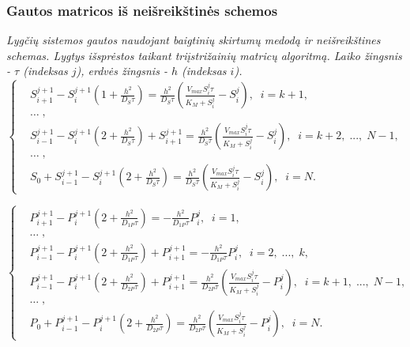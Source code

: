 \documentclass[12pt, a4paper, lithuanian]{article}
\begin{document}
\subsubsection{Gautos matricos iš neišreikštinės schemos}
\textit{Lygčių sistemos gautos naudojant baigtinių skirtumų medodą ir neišreikštines
schemas. Lygtys išsprėstos taikant triįstrižainių matricų algoritmą. Laiko
žingsnis - $\tau$ (indeksas $j$), erdvės žingsnis - $h$ (indeksas $i$).}
\begin{equation}
\left\{
\begin{aligned}
    &S_{i+1}^{j+1}-S_i^{j+1}\left(1+\frac{h^2}{D_S\tau}\right)
= \frac{h^2}{D_S\tau} \left(\frac{V_{max}S_i^j\tau}{K_M+S_i^j}-S_i^j\right),\; \;
i = k +1,\\
    &\dots\;,\\
    &S_{i-1}^{j+1}-S_i^{j+1}\left(2+\frac{h^2}{D_S\tau}\right)+S_{i+1}^{j+1}
        = \frac{h^2}{D_S\tau}
        \left(\frac{V_{max}S_i^j\tau}{K_M+S_i^j}-S_i^j\right),\; \; i =
        k +2,\;...,\;N-1,\\
    &\dots\;,\\
    &S_0 + S_{i-1}^{j+1} - S_i^{j+1}\left(2+\frac{h^2}{D_S\tau}\right)
        =  \frac{h^2}{D_S\tau}
    \left(\frac{V_{max}S_i^j\tau}{K_M+S_i^j}-S_i^j\right),\; \; i = N.
\end{aligned}
\right.
\end{equation}

\begin{equation}
\left\{
\begin{aligned}
    &P_{i+1}^{j+1}-P_i^{j+1}\left(2+\frac{h^2}{D_{1P}\tau}\right)
    = -\frac{h^2}{D_{1P}\tau} P_i^j,\; \; i = 1,\\
    &\dots\;,\\
    &P_{i-1}^{j+1}-P_i^{j+1}\left(2+\frac{h^2}{D_{1P}\tau}\right)+P_{i+1}^{j+1}
    =-\frac{h^2}{D_{1P}\tau} P_i^j,\; \; i = 2,\;...,\;k,\\
    &P_{i-1}^{j+1}-P_i^{j+1}\left(2+\frac{h^2}{D_{2P}\tau}\right)+P_{i+1}^{j+1}
    = \frac{h^2}{D_{2P}\tau}
    \left(\frac{V_{max}S_i^j\tau}{K_M+S_i^j}-P_i^j\right),\; \; i =
        k +1,\;...,\;N-1,\\
    &\dots\;,\\
    &P_0 + P_{i-1}^{j+1} - P_i^{j+1}\left(2+\frac{h^2}{D_{2P}\tau}\right)
        =  \frac{h^2}{D_{2P}\tau}
        \left(\frac{V_{max}S_i^j\tau}{K_M+S_i^j}-P_i^j\right),\; \; i = N.
\end{aligned}
\right.
\end{equation}
\end{document}
